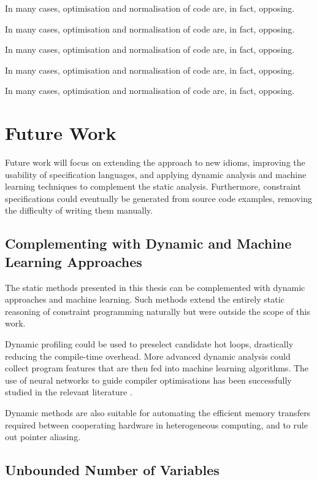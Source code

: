     In many cases, optimisation and normalisation of code are, in fact,
    opposing.

    In many cases, optimisation and normalisation of code are, in fact,
    opposing.

    In many cases, optimisation and normalisation of code are, in fact,
    opposing.

    In many cases, optimisation and normalisation of code are, in fact,
    opposing.

    In many cases, optimisation and normalisation of code are, in fact,
    opposing.

\section{Future Work}

    Future work will focus on extending the approach to new idioms,
    improving the usability of specification languages, and applying dynamic
    analysis and machine learning techniques to complement the static analysis.
    Furthermore, constraint specifications could eventually be generated from
    source code examples, removing the difficulty of writing them manually.

\subsection*{Complementing with Dynamic and Machine Learning Approaches}

    The static methods presented in this thesis can be complemented with dynamic
    approaches and machine learning.
    Such methods extend the entirely static reasoning of constraint programming
    naturally but were outside the scope of this work.

    Dynamic profiling could be used to preselect candidate hot loops,
    drastically reducing the compile-time overhead.
    More advanced dynamic analysis could collect program features that are
    then fed into machine learning algorithms.
    The use of neural networks to guide compiler optimisations has been
    successfully studied in the relevant literature
    \citep{DBLP:journals/pieee/WangO18}.

    Dynamic methods are also suitable for automating the efficient memory
    transfers required between cooperating hardware in heterogeneous
    computing, and to rule out pointer aliasing.

\subsection*{Unbounded Number of Variables}

